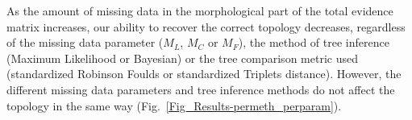 \documentclass[12pt,letterpaper]{article}
\begin{document}


As the amount of missing data in the morphological part of the total evidence matrix increases, our ability to recover the correct topology decreases, regardless of the missing data parameter ($M_{L}$, $M_{C}$ or $M_{F}$), the method of tree inference (Maximum Likelihood or Bayesian) or the tree comparison metric used (standardized Robinson Foulds or standardized Triplets distance). 
However, the different missing data parameters and tree inference methods do not affect the topology in the same way (Fig.~\ref{Fig_Results-permeth_perparam}). %

\end{document}
